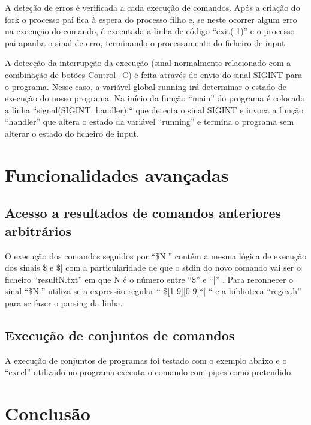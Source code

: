 \documentclass[11pt,a4paper]{report}
\begin{document}
A deteção de erros é verificada a cada execução de comandos. Após a criação do fork o processo pai fica à espera do processo filho e, se neste ocorrer algum erro na execução do comando, é executada a linha de código “exit(-1)” e o processo pai apanha o sinal de erro, terminando o processamento do ficheiro de input.


A detecção da interrupção da execução (sinal normalmente relacionado com a combinação de botões Control+C) é feita através do envio do sinal SIGINT para o programa. Nesse caso, a variável global running irá determinar o estado de execução do nosso programa. 
Na início da função “main” do programa é colocado a linha “signal(SIGINT, handler);“ que detecta o sinal SIGINT e invoca a função “handler” que altera o estado da variável “running” e termina o programa sem alterar o estado do ficheiro de input.


\chapter{Funcionalidades avançadas}
\section{Acesso a resultados de comandos anteriores arbitrários}

O execução dos comandos seguidos por “\$N|” contém a mesma lógica de execução dos sinais \$ e \$| com a particularidade de que o stdin do novo comando vai ser o ficheiro “resultN.txt” em que N é o número entre “\$” e “|” .
Para reconhecer o sinal “\$N|” utiliza-se a expressão regular “ \$[1-9][0-9]*| “ e a biblioteca “regex.h” para se fazer o parsing da linha.



\section{Execução de conjuntos de comandos}
A execução de conjuntos de programas foi testado com o exemplo abaixo e o “execl” utilizado no programa executa o comando com pipes como pretendido.





\chapter{Conclusão}
\end{document}
